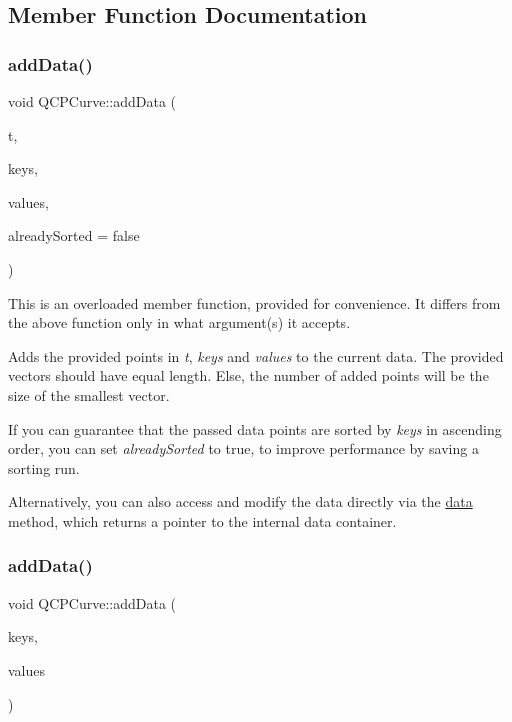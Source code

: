 \subsection{Member Function Documentation}
\mbox{\label{class_q_c_p_curve_a73edf394b94f3f24f07518e30565a07f}} 
\subsubsection{\texorpdfstring{add\+Data()}{addData()}\hspace{0.1cm}{\footnotesize\ttfamily [1/4]}}
{\footnotesize\ttfamily void Q\+C\+P\+Curve\+::add\+Data (\begin{DoxyParamCaption}\item[{const Q\+Vector$<$ double $>$ \&}]{t,  }\item[{const Q\+Vector$<$ double $>$ \&}]{keys,  }\item[{const Q\+Vector$<$ double $>$ \&}]{values,  }\item[{bool}]{already\+Sorted = {\ttfamily false} }\end{DoxyParamCaption})}

This is an overloaded member function, provided for convenience. It differs from the above function only in what argument(s) it accepts.

Adds the provided points in {\itshape t}, {\itshape keys} and {\itshape values} to the current data. The provided vectors should have equal length. Else, the number of added points will be the size of the smallest vector.

If you can guarantee that the passed data points are sorted by {\itshape keys} in ascending order, you can set {\itshape already\+Sorted} to true, to improve performance by saving a sorting run.

Alternatively, you can also access and modify the data directly via the \hyperlink{class_q_c_p_curve_a761492fd00b1ab7cb18ce23c118c6c60}{data} method, which returns a pointer to the internal data container. \mbox{\label{class_q_c_p_curve_a6424fa06da1786648c83ad13a0d0aa14}} 
\subsubsection{\texorpdfstring{add\+Data()}{addData()}\hspace{0.1cm}{\footnotesize\ttfamily [2/4]}}
{\footnotesize\ttfamily void Q\+C\+P\+Curve\+::add\+Data (\begin{DoxyParamCaption}\item[{const Q\+Vector$<$ double $>$ \&}]{keys,  }\item[{const Q\+Vector$<$ double $>$ \&}]{values }\end{DoxyParamCaption})}

